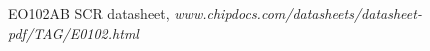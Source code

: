 \documentclass[journal]{IEEEtran}
\begin{document}


%
%
\begin{thebibliography}{1}

		EO102AB SCR datasheet, \textit{www.chipdocs.com/datasheets/datasheet-pdf/TAG/E0102.html}

\end{thebibliography}
\end{document}
